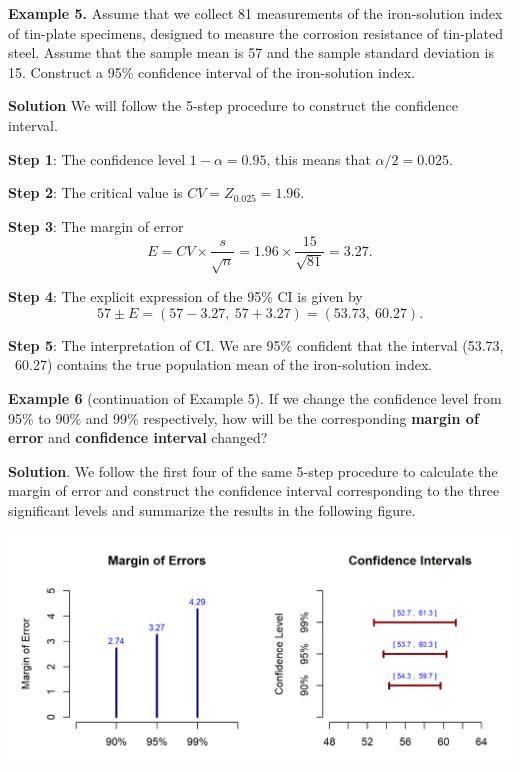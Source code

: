 \documentclass[
]{book}
\begin{document}
\hfill\break

\textbf{Example 5.} Assume that we collect 81 measurements of the iron-solution index of tin-plate specimens, designed to measure the corrosion resistance of tin-plated steel. Assume that the sample mean is 57 and the sample standard deviation is 15. Construct a 95\% confidence interval of the iron-solution index.

\textbf{Solution} We will follow the 5-step procedure to construct the confidence interval.

\textbf{Step 1}: The confidence level \(1 - \alpha = 0.95\), this means that \(\alpha/2 = 0.025\).

\textbf{Step 2}: The critical value is \(CV = Z_{0.025} = 1.96.\)

\textbf{Step 3}: The margin of error
\[
E = CV\times \frac{s}{\sqrt{n}} = 1.96\times \frac{15}{\sqrt{81}} = 3.27.
\]

\textbf{Step 4}: The explicit expression of the 95\% CI is given by
\[
57 \pm E = (57 - 3.27, \ 57 + 3.27) = (53.73, \ 60.27).
\]

\textbf{Step 5}: The interpretation of CI.
We are 95\% confident that the interval (53.73, ~60.27) contains the true population mean of the iron-solution index.

\hfill\break

\textbf{Example 6} (continuation of Example 5). If we change the confidence level from 95\% to 90\% and 99\% respectively, how will be the corresponding \textbf{margin of error} and \textbf{confidence interval} changed?

\textbf{Solution}. We follow the first four of the same 5-step procedure to calculate the margin of error and construct the confidence interval corresponding to the three significant levels and summarize the results in the following figure.

\begin{center}\includegraphics[width=0.8\linewidth]{week06/marginEandWidthCI} \end{center}
\end{document}
